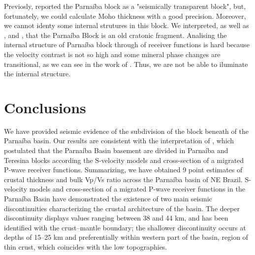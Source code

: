 \documentclass[paper,11pt]{geophysics}
\begin{document}
Previosly, \cite{daly_brasiliano_2014} reported the Parnaíba block as a "seismically transparent block", but, fortunately, we could calculate Moho thickness with a good precision. Moreover, we cannot identy some internal strutures in this block. We interpreted, as well as \cite{fuck_rodinia_2008}, \cite{brito_neves_basement_2014} and \cite{assumpcao_crustal_2013}, that the Parnaíba Block is an old cratonic fragment. Analising the internal structure of Parnaíba block through of receiver functions is hard because the velocity contrast is not so high and some mineral phase changes are transitional, as we can see in the work of \cite{assumpcao_shield_2002}. Thus, we are not be able to iluminate the internal structure.

\section{Conclusions}

We have provided seismic evidence of the subdivision of the block beneath of the Parnaíba basin. Our results are consistent with the interpretation of \cite{de_castro_crustal_2014}, which postulated that the Parnaíba Basin basement are divided in Parnaíba and Teresina blocks according the S-velocity models and cross-section of a migrated P-wave receiver functions. Summarizing, we have obtained 9 point estimates of crustal thickness and bulk Vp/Vs ratio across the Parnaíba basin of NE Brazil. S-velocity models and cross-section of a migrated P-wave receiver functions in the Parnaíba Basin have demonstrated the existence of two main seismic discontinuities characterizing the crustal architecture of the basin. The deeper discontinuity displays values ranging between 38 and 44 km, and has been identified with the crust–mantle boundary; the shallower discontinuity occurs at depths of 15–25 km and preferentially within western part of the basin, region of thin crust, which coincides with the low topographies.



    
\end{document}
